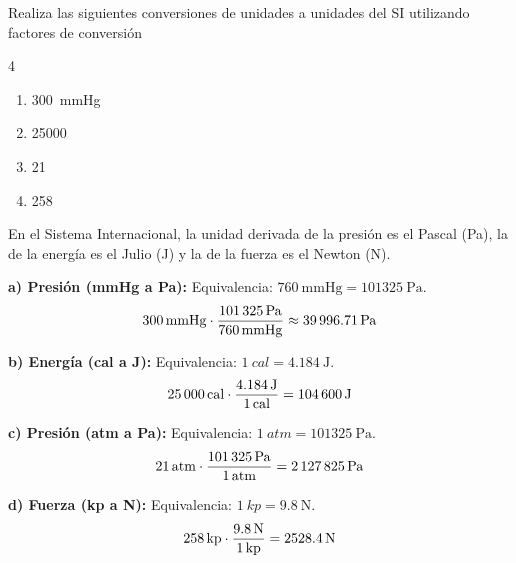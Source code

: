 \begin{exercise}
    Realiza las siguientes conversiones de unidades a unidades del SI utilizando factores de conversión
    \begin{multicols}{4}
        \begin{enumerate}[label=\letraminuscula]
\item \qty{300}{\mmHg}
\item \qty{25000}{\cal}
\item \qty{21}{\atmosphere}
\item \qty{258}{\kilopondio}
        \end{enumerate}
    \end{multicols}


    \begin{solu}
        En el Sistema Internacional, la unidad derivada de la presión es el Pascal (\unit{\Pa}), la de la energía es el Julio (\unit{\J}) y la de la fuerza es el Newton (\unit{\N}).

        \textbf{a) Presión (\unit{\mmHg} a \unit{\Pa}):}
        Equivalencia: \( \qty{760}{\mmHg} = \qty{101325}{\Pa} \).
        \[ \qty{300}{\cancel{\mmHg}} \cdot \frac{\qty{101325}{\Pa}}{\qty{760}{\cancel{\mmHg}}} \approx \qty{39996.71}{\Pa} \]

        \textbf{b) Energía (\unit{cal} a \unit{\J}):}
        Equivalencia: \( \qty{1}{cal} = \qty{4.184}{\J} \).
        \[ \qty{25000}{\cancel{cal}} \cdot \frac{\qty{4.184}{\J}}{\qty{1}{\cancel{cal}}} = \qty{104600}{\J} \]

        \textbf{c) Presión (\unit{atm} a \unit{\Pa}):}
        Equivalencia: \( \qty{1}{atm} = \qty{101325}{\Pa} \).
        \[ \qty{21}{\cancel{atm}} \cdot \frac{\qty{101325}{\Pa}}{\qty{1}{\cancel{atm}}} = \qty{2127825}{\Pa} \]

        \textbf{d) Fuerza (\unit{kp} a \unit{\N}):}
        Equivalencia: \( \qty{1}{kp} = \qty{9.8}{\N} \).
        \[ \qty{258}{\cancel{kp}} \cdot \frac{\qty{9.8}{\N}}{\qty{1}{\cancel{kp}}} = \qty{2528.4}{\N} \]
    \end{solu}

\end{exercise}

